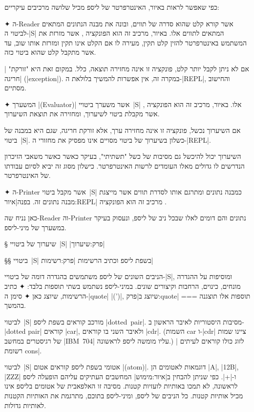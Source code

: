 כפי שאפשר לראות באיור, האינטרפרטר של ליספ מכיל שלושה מרכיבים עיקריים:
\begin{enumerate}

  ✦ ה-Reader אשר קורא קלט שהוא סדרה של תווים, ובונה את מבנה הנתונים המתאים
  לביטוי ה-\E|S| המתאים לתווים אלו. באיור, מרכיב זה הוא הפונקציה ,
  אשר מזרזת את המשתמש באינטרפרטר להזין קלט תקין, מעירה לו אם הקלט אינו תקין
  ומזרזת אותו שוב, עד אשר מתקבל קלט שהוא ביטוי כזה.

  אם לא ניתן לקבל יותר קלט, פונקציה זו אינה מחזירה תוצאה, כלל. במקום זאת היא
  "זורקת" \ע|חריגה| (\E|exception|). במקרה זה, אין אפשרות להמשיך בלולאת
  ה-\E|REPL|, והחישוב מסתיים.

  ✦ המשערך \E|(Evaluator)| אשר משערך ביטויי~\E|S| אלו. באיור, מרכיב זה הוא
  הפונקציה , אשר מקבלת ביטוי לשיערוך, ומחזירה את תוצאת השיערוך.

  אם השיערוך נכשל, פונקציה זו אינה מחזירה ערך, אלא זורקת חריגה, שגם היא במבנה
  של ביטוי~\E|S|. כשלון בשיערוך של ביטוי מסויים אינו מפסיק את מחזורי
  ה-\E|REPL|.

  השיערוך יכול להיכשל גם מסיבות של כשל "תשתיתי", בעיקר כאשר כאשר משאבי הזיכרון
  הנדרשים לו גדולים מאלו העומדים לרשות האינטרפרטר. כישלון מסוג זה יביא לסיום עבודתו
  של האינטרפרטר.

  ✦ ה-Printer אשר מקבל ביטוי~\E|S| כמבנה נתונים ומתרגם אותו לסדרת תווים אשר
  מייצגת מבנה נתונים זה. בפנה|איור:REPL| מרכיב זה הוא הפונקציה .
\end{enumerate}

כאן נניח שה-Reader וה-Printer נתונים והם דומים לאלו שבכל ניב של ליספ, ונעסוק
בעיקר במשערך של מיני-ליספ.

§ שיערוך של ביטויי~\E|S|
|פרק:שיערוך|

§§ ביטויי~\E|S| בשפת ליספ וכתיב הרשימות
|פרק:רשימות|

הניבים השונים של ליספ משתמשים בהגדרה דומה של ביטויי-\E|S|, ומוסיפות על ההגדרה
מונחים, כינוים, הרחבות וקיצורים שונים. במיני-ליספ נשתמש בשתי תוספות בלבד:
✦ כתיב הרשימות, שיוצג כאן
✦ סימן ה-\E|quote| \E|(')|, שיוצג ב|פרק:quote|
===
תוספות אלו תוצגנה בהמשך.

לביטוי~\E|S| מורכב קוראים בשפת ליספ \E|dotted~pair|. מסיבות היסטוריות לאיבר
הראשון ב-\E|dotted pair| קוראים \E|car|, ולאיבר השני בו קוראים \E|cdr|.
(השמות car ו-\E|cdr| ציינו שמות של רגיסטרים במחשב \E|IBM~704| עליו מומשה ליספ
לראשונה.) לזוג כולו קוראים לעיתים \ע|רשומת cons|.

לביטוי~\E|S| אטומי בשפת ליספ קוראים אטום \E|(atom)|. דוגמאות לאטומים הן \E|A|,
\E|12B|, \E|ZZZ| ו-\E|+|. כפי שניתן להבחין ב|איור:מימוש| המחשבים העתיקים עליהם
הופעלה ליספ לראשונה, לא תמכו באותיות לועזיות קטנות. מסיבה זו האלפאבית של אטומים
בליספ אינו מכיל אותיות קטנות. כל הניבים של ליספ, ומיני-ליספ בתוכם, מתרגמת את
האותיות הקטנות לאותיות גדולות.

